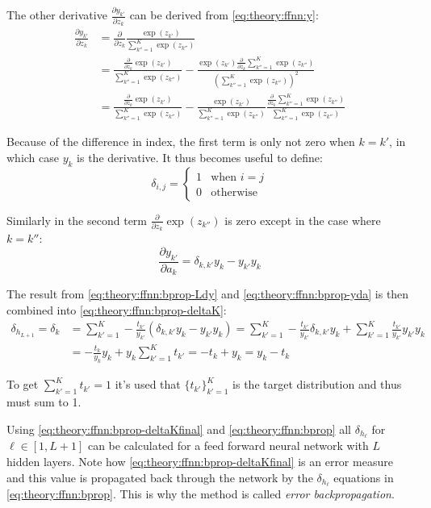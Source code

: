 The other derivative $\frac{\partial y_{k'}}{\partial z_k}$ can be derived from \eqref{eq:theory:ffnn:y}:
\begin{equation}
\begin{aligned}
\frac{\partial y_{k'}}{\partial z_k}
&= \frac{\partial}{\partial z_k} \frac{\exp(z_{k'})}{\sum_{k''=1}^K \exp(z_{k''})} \\
&= \frac{\frac{\partial}{\partial z_k} \exp(z_{k'})}{\sum_{k''=1}^K \exp(z_{k''})}
- \frac{\exp(z_{k'}) \frac{\partial}{\partial z_k} \sum_{k''=1}^K \exp(z_{k''})}{\left(\sum_{k''=1}^K \exp(z_{k''})\right)^2} \\
&= \frac{\frac{\partial}{\partial z_k} \exp(z_{k'})}{\sum_{k''=1}^K \exp(z_{k''})}
- \frac{\exp(z_{k'})}{\sum_{k''=1}^K \exp(z_{k''})} \frac{\frac{\partial}{\partial z_k} \sum_{k''=1}^K \exp(z_{k''})}{\sum_{k''=1}^K \exp(z_{k''})}
\end{aligned}
\end{equation}

Because of the difference in index, the first term is only not zero when $k = k'$, in which case $y_k$ is the derivative. It thus becomes useful to define:
\begin{equation}
\delta_{i,j} = \begin{cases}1& \text{when } i = j \\ 0 & \text{otherwise}\end{cases}
\end{equation}

Similarly in the second term $\frac{\partial}{\partial z_k} \exp(z_{k''})$ is zero except in the case where $k = k''$:
\begin{equation}
\frac{\partial y_{k'}}{\partial a_k} = \delta_{k, k'} y_k - y_{k'} y_k
\label{eq:theory:ffnn:bprop-yda}
\end{equation}

The result from \eqref{eq:theory:ffnn:bprop-Ldy} and \eqref{eq:theory:ffnn:bprop-yda} is then combined into \eqref{eq:theory:ffnn:bprop-deltaK}:
\begin{equation}
\begin{aligned}
\delta_{h_{L + 1}} = \delta_k &= \sum_{k'=1}^K -\frac{t_{k'}}{y_{k'}} \left( \delta_{k, k'} y_k - y_{k'} y_k \right) = \sum_{k'=1}^K -\frac{t_{k'}}{y_{k'}} \delta_{k, k'} y_k + \sum_{k'=1}^K \frac{t_{k'}}{y_{k'}} y_{k'} y_k \\
&= -\frac{t_k}{y_k} y_k + y_k \sum_{k'=1}^K t_{k'} = -t_k + y_k = y_k - t_k
\end{aligned}
\label{eq:theory:ffnn:bprop-deltaKfinal}
\end{equation}

To get $\sum_{k'=1}^K t_{k'} = 1$ it's used that $\{ t_{k'} \}_{k'=1}^K$ is the target distribution and thus must sum to 1.

Using \eqref{eq:theory:ffnn:bprop-deltaKfinal} and \eqref{eq:theory:ffnn:bprop} all $\delta_{h_\ell}$ for $\ell \in [1, L+1]$ can be calculated for a feed forward neural network with $L$ hidden layers. Note how \eqref{eq:theory:ffnn:bprop-deltaKfinal} is an error measure and this value is propagated back through the network by the $\delta_{h_\ell}$ equations in \eqref{eq:theory:ffnn:bprop}. This is why the method is called \textit{error backpropagation}.
